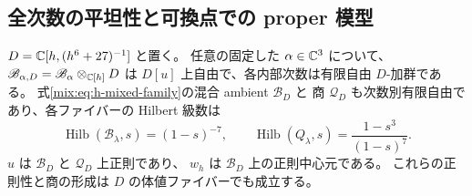 \subsection{全次数の平坦性と可換点での proper 模型}

\begin{proposition}[交換子族の全次数の自由性]
\label{mix:prop:h-flat}
$D=\mathbb C[h,(h^6+27)^{-1}]$ と置く。
任意の固定した $\alpha\in\mathbb C^3$ について、
$\mathscr B_{\alpha,D}=\mathscr B_\alpha\otimes_{\mathbb C[h]}D$ は
$D[u]$ 上自由で、各内部次数は有限自由 $D$-加群である。
式\eqref{mix:eq:h-mixed-family}の混合 ambient $\mathscr B_D$ と
商 $\mathscr Q_D$ も次数別有限自由であり、各ファイバーの Hilbert 級数は
\begin{equation}\label{mix:eq:h-hilbert}
 \operatorname{Hilb}(\mathscr B_\lambda,s)=(1-s)^{-7},\qquad
 \operatorname{Hilb}(Q_\lambda,s)=\frac{1-s^3}{(1-s)^7}.
\end{equation}
$u$ は $\mathscr B_D$ と $\mathscr Q_D$ 上正則であり、
$w_h$ は $\mathscr B_D$ 上の正則中心元である。
これらの正則性と商の形成は $D$ の体値ファイバーでも成立する。
\end{proposition}

